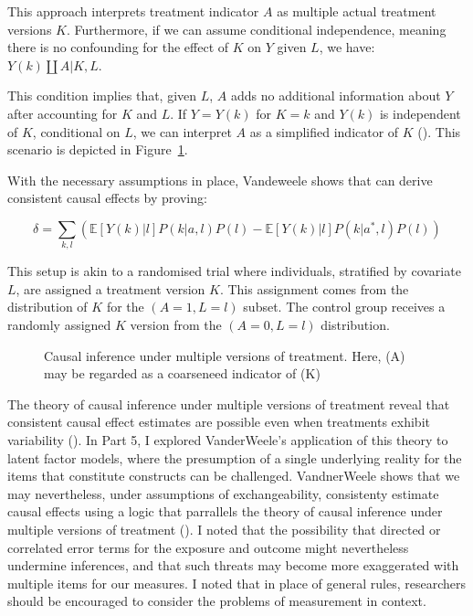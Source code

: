 \documentclass[
  singlecolumn,
  9pt]{article}
\begin{document}
This approach interprets treatment indicator \(A\) as multiple actual
treatment versions \(K\). Furthermore, if we can assume conditional
independence, meaning there is no confounding for the effect of \(K\) on
\(Y\) given \(L\), we have: \(Y(k)\coprod A|K,L\).

This condition implies that, given \(L\), \(A\) adds no additional
information about \(Y\) after accounting for \(K\) and \(L\). If
\(Y = Y(k)\) for \(K = k\) and \(Y(k)\) is independent of \(K\),
conditional on \(L\), we can interpret \(A\) as a simplified indicator
of \(K\) ().
This scenario is depicted in
Figure~\ref{fig-dag-multiple-version-treatment-dag}.

With the necessary assumptions in place, Vandeweele shows that can
derive consistent causal effects by proving:

\[\delta = \sum_{k,l} \left( \mathbb{E}[Y(k)|l] P(k|a,l) P(l) - \mathbb{E}[Y(k)|l] P(k|a^*,l) P(l) \right) \]

This setup is akin to a randomised trial where individuals, stratified
by covariate \(L\), are assigned a treatment version \(K\). This
assignment comes from the distribution of \(K\) for the
\((A = 1, L = l)\) subset. The control group receives a randomly
assigned \(K\) version from the \((A = 0, L = l)\) distribution.

\begin{figure}


\caption{\label{fig-dag-multiple-version-treatment-dag}Causal inference
under multiple versions of treatment. Here, (A) may be regarded as a
coarseneed indicator of (K)}

\end{figure}%

The theory of causal inference under multiple versions of treatment
reveal that consistent causal effect estimates are possible even when
treatments exhibit variability
(). In Part
5, I explored VanderWeele's application of this theory to latent factor
models, where the presumption of a single underlying reality for the
items that constitute constructs can be challenged. VandnerWeele shows
that we may nevertheless, under assumptions of exchangeability,
consistenty estimate causal effects using a logic that parrallels the
theory of causal inference under multiple versions of treatment
(). I noted that the
possibility that directed or correlated error terms for the exposure and
outcome might nevertheless undermine inferences, and that such threats
may become more exaggerated with multiple items for our measures. I
noted that in place of general rules, researchers should be encouraged
to consider the problems of measurement in context.
\end{document}
